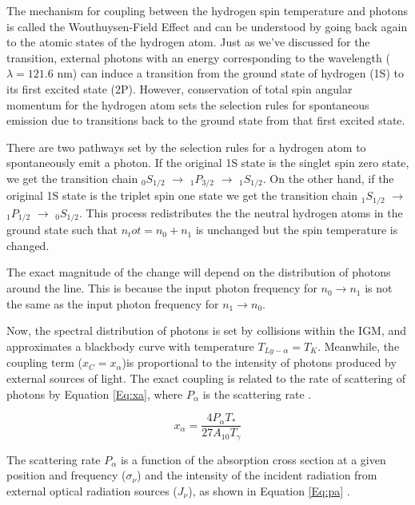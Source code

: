 The mechanism for coupling between the hydrogen spin temperature and \lya  photons is called the Wouthuysen-Field Effect \cite{wouthuysen_1952}\cite{field_1958} and can be understood by going back again to the atomic states of the hydrogen atom. Just as we've discussed for the \cm transition, external photons with an energy corresponding to the \lya  wavelength ($\lambda = 121.6$ nm) can induce a transition from the ground state of hydrogen (1S) to its first excited state (2P). However, conservation of total spin angular momentum for the hydrogen atom sets the selection rules for spontaneous emission due to transitions back to the ground state from that first excited state. 

There are two pathways set by the selection rules for a hydrogen atom to spontaneously emit a \lya  photon. If the original 1S state is the singlet spin zero state, we get the transition chain $_0S_{1/2}$ $\rightarrow$ $_1P_{3/2}$ $\rightarrow$ $_1S_{1/2}$. On the other hand, if the original 1S state is the triplet spin one state we get the transition chain $_1S_{1/2}$ $\rightarrow$ $_1P_{1/2}$ $\rightarrow$ $_0S_{1/2}$. This process redistributes the the neutral hydrogen atoms in the ground state such that $n_tot = n_0 + n_1$ is unchanged but the spin temperature is changed. 

The exact magnitude of the change will depend on the distribution of photons around the \lya  line. This is because the input photon frequency for $n_0 \rightarrow n_1$ is not the same as the input photon frequency for $n_1 \rightarrow n_0$.

Now, the spectral distribution of \lya  photons is set by collisions within the IGM, and approximates a blackbody curve with temperature $T_{Ly-\alpha} = T_K$. Meanwhile, the \lya  coupling term ($x_C = x_{\alpha}$)is proportional to the intensity of \lya  photons produced by external sources of light. The exact \lya  coupling is related to the rate of scattering of \lya  photons by Equation \ref{Eq:xa}, where $P_{\alpha}$ is the scattering rate \cite{furlanetto_2006}. 

\begin{equation}\label{Eq:xa}
x_{\alpha} = \frac{4 P_{\alpha} T_*}{27 A_{10} T_{\gamma}}
\end{equation}

The scattering rate $P_{\alpha}$ is a function of the absorption cross section at a given position and frequency ($\sigma_{\nu}$) and the intensity of the incident radiation from external optical radiation sources ($J_{\nu}$), as shown in Equation \ref{Eq:pa} \cite{furlanetto_2006}. 

